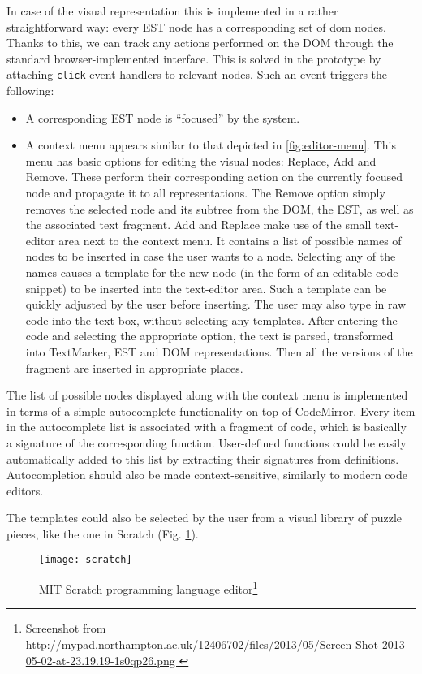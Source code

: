 In case of the visual representation this is implemented in a rather straightforward way: every EST node has a corresponding set of \acrshort{dom} nodes. Thanks to this, we can track any actions performed on the DOM through the standard browser-implemented interface. This is solved in the prototype by attaching \texttt{click} event handlers to relevant nodes. Such an event triggers the following:
\begin{itemize}
    \item A corresponding EST node is ``focused'' by the system. 
    \item A context menu appears similar to that depicted in \ref{fig:editor-menu}. This menu has basic options for editing the visual nodes: Replace, Add and Remove. These perform their corresponding action on the currently focused node and propagate it to all representations. The Remove option simply removes the selected node and its subtree from the DOM, the EST, as well as the associated text fragment. Add and Replace make use of the small text-editor area next to the context menu. It contains a list of possible names of nodes to be inserted in case the user wants to  a node. Selecting any of the names causes a template for the new node (in the form of an editable code snippet) to be inserted into the text-editor area. Such a template can be quickly adjusted by the user before inserting. The user may also type in raw code into the text box, without selecting any templates. After entering the code and selecting the appropriate option, the text is parsed, transformed into TextMarker, EST and DOM representations. Then all the versions of the fragment are inserted in appropriate places.
\end{itemize}

The list of possible nodes displayed along with the context menu is implemented in terms of a simple autocomplete functionality on top of CodeMirror. Every item in the autocomplete list is associated with a fragment of code, which is basically a signature of the corresponding function. User-defined functions could be easily automatically added to this list by extracting their signatures from definitions. Autocompletion should also be made context-sensitive, similarly to modern code editors.

The templates could also be selected by the user from a visual library of puzzle pieces, like the one in Scratch (Fig. \ref{fig:scratch}).
\begin{figure}[h!]
\centering
\texttt{[image: scratch]}
\caption{ MIT Scratch programming language editor\protect\footnote{ Screenshot from \url{
http://mypad.northampton.ac.uk/12406702/files/2013/05/Screen-Shot-2013-05-02-at-23.19.19-1s0qp26.png } } }
\label{fig:scratch}
\end{figure}


